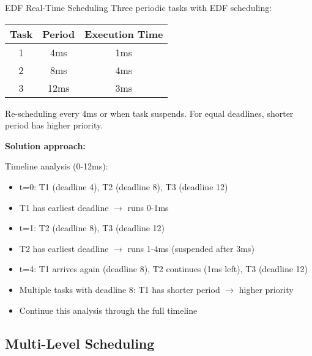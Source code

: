 \begin{example2}{EDF Real-Time Scheduling}
    Three periodic tasks with EDF scheduling:
    
    \begin{tabular}{|c|c|c|}
        \hline
        Task & Period & Execution Time \\
        \hline
        1 & 4ms & 1ms \\
        2 & 8ms & 4ms \\
        3 & 12ms & 3ms \\
        \hline
    \end{tabular}
    
    Re-scheduling every 4ms or when task suspends.
    For equal deadlines, shorter period has higher priority.
    
    \tcblower
    
    \textbf{Solution approach:}
    
    Timeline analysis (0-12ms):
    \begin{itemize}
        \item t=0: T1 (deadline 4), T2 (deadline 8), T3 (deadline 12)
        \item T1 has earliest deadline $\rightarrow$ runs 0-1ms
        \item t=1: T2 (deadline 8), T3 (deadline 12)  
        \item T2 has earliest deadline $\rightarrow$ runs 1-4ms (suspended after 3ms)
        \item t=4: T1 arrives again (deadline 8), T2 continues (1ms left), T3 (deadline 12)
        \item Multiple tasks with deadline 8: T1 has shorter period $\rightarrow$ higher priority
        \item Continue this analysis through the full timeline
    \end{itemize}
\end{example2}

\subsection{Multi-Level Scheduling}

